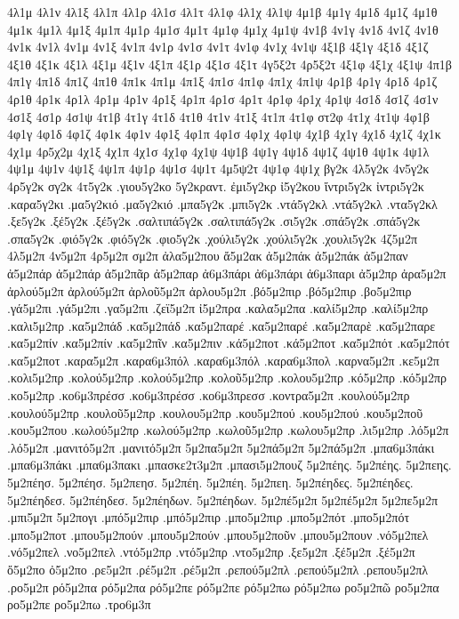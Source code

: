 {4λ1μ
4λ1ν
4λ1ξ
4λ1π
4λ1ρ
4λ1σ
4λ1τ
4λ1φ
4λ1χ
4λ1ψ
4μ1β
4μ1γ
4μ1δ
4μ1ζ
4μ1θ
4μ1κ
4μ1λ
4μ1ξ
4μ1π
4μ1ρ
4μ1σ
4μ1τ
4μ1φ
4μ1χ
4μ1ψ
4ν1β
4ν1γ
4ν1δ
4ν1ζ
4ν1θ
4ν1κ
4ν1λ
4ν1μ
4ν1ξ
4ν1π
4ν1ρ
4ν1σ
4ν1τ
4ν1φ
4ν1χ
4ν1ψ
4ξ1β
4ξ1γ
4ξ1δ
4ξ1ζ
4ξ1θ
4ξ1κ
4ξ1λ
4ξ1μ
4ξ1ν
4ξ1π
4ξ1ρ
4ξ1σ
4ξ1τ
4γ5ξ2τ
4ρ5ξ2τ
4ξ1φ
4ξ1χ
4ξ1ψ
4π1β
4π1γ
4π1δ
4π1ζ
4π1θ
4π1κ
4π1μ
4π1ξ
4π1σ
4π1φ
4π1χ
4π1ψ
4ρ1β
4ρ1γ
4ρ1δ
4ρ1ζ
4ρ1θ
4ρ1κ
4ρ1λ
4ρ1μ
4ρ1ν
4ρ1ξ
4ρ1π
4ρ1σ
4ρ1τ
4ρ1φ
4ρ1χ
4ρ1ψ
4σ1δ
4σ1ζ
4σ1ν
4σ1ξ
4σ1ρ
4σ1ψ
4τ1β
4τ1γ
4τ1δ
4τ1θ
4τ1ν
4τ1ξ
4τ1π
4τ1φ
στ2φ
4τ1χ
4τ1ψ
4φ1β
4φ1γ
4φ1δ
4φ1ζ
4φ1κ
4φ1ν
4φ1ξ
4φ1π
4φ1σ
4φ1χ
4φ1ψ
4χ1β
4χ1γ
4χ1δ
4χ1ζ
4χ1κ
4χ1μ
4ρ5χ2μ
4χ1ξ
4χ1π
4χ1σ
4χ1φ
4χ1ψ
4ψ1β
4ψ1γ
4ψ1δ
4ψ1ζ
4ψ1θ
4ψ1κ
4ψ1λ
4ψ1μ
4ψ1ν
4ψ1ξ
4ψ1π
4ψ1ρ
4ψ1σ
4ψ1τ
4μ5ψ2τ
4ψ1φ
4ψ1χ
βγ2κ
4λ5γ2κ
4ν5γ2κ
4ρ5γ2κ
σγ2κ
4τ5γ2κ
.γιου5γ2κο
5γ2κραντ.
ἐμι5γ2κρ
ἰ5γ2κου
ἴντρι5γ2κ
ἰντρι5γ2κ
.καρα5γ2κι
.μα5γ2κιό  .μα5γ2κιό
.μπα5γ2κ
.μπι5γ2κ
.ντά5γ2κλ  .ντά5γ2κλ
.ντα5γ2κλ
.ξε5γ2κ
.ξέ5γ2κ  .ξέ5γ2κ
.σαλτιπά5γ2κ  .σαλτιπά5γ2κ
.σι5γ2κ
.σπά5γ2κ  .σπά5γ2κ
.σπα5γ2κ
.φιό5γ2κ  .φιό5γ2κ
.φιο5γ2κ
.χούλι5γ2κ  .χούλι5γ2κ
.χουλι5γ2κ
4ζ5μ2π
4λ5μ2π
4ν5μ2π
4ρ5μ2π
σμ2π
ἀλα5μ2που
ἄ5μ2ακ
ἀ5μ2πάκ  ἀ5μ2πάκ
ἀ5μ2παν
ἀ5μ2πάρ  ἀ5μ2πάρ
ἀ5μ2πᾶρ
ἀ5μ2παρ
ἀ6μ3πάρι  ἀ6μ3πάρι
ἀ6μ3παρι
ἀ5μ2πρ
ἀρα5μ2π
ἀρλού5μ2π  ἀρλού5μ2π
ἀρλοῦ5μ2π
ἀρλου5μ2π
.βό5μ2πιρ  .βό5μ2πιρ
.βο5μ2πιρ
.γά5μ2πι  .γά5μ2πι
.γα5μ2πι
.ζεϊ5μ2π
ἰ5μ2πρα
.καλα5μ2πα
.καλί5μ2πρ  .καλί5μ2πρ
.καλι5μ2πρ
.κα5μ2πάδ  .κα5μ2πάδ
.κα5μ2παρέ  .κα5μ2παρέ
.κα5μ2παρὲ
.κα5μ2παρε
.κα5μ2πίν  .κα5μ2πίν
.κα5μ2πῖν
.κα5μ2πιν
.κά5μ2ποτ  .κά5μ2ποτ
.κα5μ2πότ  .κα5μ2πότ
.κα5μ2ποτ
.καρα5μ2π
.καρα6μ3πόλ  .καρα6μ3πόλ
.καρα6μ3πολ
.καρνα5μ2π
.κε5μ2π
.κολι5μ2πρ
.κολού5μ2πρ  .κολού5μ2πρ
.κολοῦ5μ2πρ
.κολου5μ2πρ
.κό5μ2πρ  .κό5μ2πρ
.κο5μ2πρ
.κο6μ3πρέσσ  .κο6μ3πρέσσ
.κο6μ3πρεσσ
.κοντρα5μ2π
.κουλού5μ2πρ  .κουλού5μ2πρ
.κουλοῦ5μ2πρ
.κουλου5μ2πρ
.κου5μ2πού  .κου5μ2πού
.κου5μ2ποῦ
.κου5μ2που
.κωλού5μ2πρ  .κωλού5μ2πρ
.κωλοῦ5μ2πρ
.κωλου5μ2πρ
.λι5μ2πρ
.λό5μ2π  .λό5μ2π
.μανιτό5μ2π  .μανιτό5μ2π
5μ2πα5μ2π
5μ2πά5μ2π  5μ2πά5μ2π
.μπα6μ3πάκι  .μπα6μ3πάκι
.μπα6μ3πακι
.μπασκε2τ3μ2π
.μπασι5μ2πουζ
5μ2πέης.  5μ2πέης.
5μ2πεης.
5μ2πέησ.  5μ2πέησ.
5μ2πεησ.
5μ2πέη.  5μ2πέη.
5μ2πεη.
5μ2πέηδες.  5μ2πέηδες.
5μ2πέηδεσ.  5μ2πέηδεσ.
5μ2πέηδων.  5μ2πέηδων.
5μ2πέ5μ2π  5μ2πέ5μ2π
5μ2πε5μ2π
.μπι5μ2π
5μ2πογι
.μπό5μ2πιρ  .μπό5μ2πιρ
.μπο5μ2πιρ
.μπο5μ2πότ  .μπο5μ2πότ
.μπο5μ2ποτ
.μπου5μ2πούν  .μπου5μ2πούν
.μπου5μ2ποῦν
.μπου5μ2πουν
.νό5μ2πελ  .νό5μ2πελ
.νο5μ2πελ
.ντό5μ2πρ  .ντό5μ2πρ
.ντο5μ2πρ
.ξε5μ2π
.ξέ5μ2π  .ξέ5μ2π
ὄ5μ2πο
ὀ5μ2πο
.ρε5μ2π
.ρέ5μ2π  .ρέ5μ2π
.ρεπού5μ2πλ  .ρεπού5μ2πλ
.ρεπου5μ2πλ
.ρο5μ2π
ρό5μ2πα  ρό5μ2πα
ρό5μ2πε  ρό5μ2πε
ρό5μ2πω  ρό5μ2πω
ρο5μ2πῶ
ρο5μ2πα
ρο5μ2πε
ρο5μ2πω
.τρο6μ3π
}

